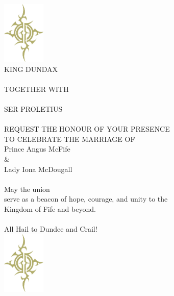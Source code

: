 {\centering%
	\vspace*{1cm}\hfill\\%
	\includegraphics[height=3cm,keepaspectratio]{../images/Gloryhammer_Coat_of_Arms-gold}\\
	{\darkcrystalfont\color{white}%
		{\LARGE KING DUNDAX \\\hfill\\}%
		{\large TOGETHER WITH\\\hfill\\}%
		{\LARGE SER PROLETIUS\\\hfill\\}%
		{\large REQUEST THE HONOUR OF YOUR PRESENCE\\TO CELEBRATE THE MARRIAGE OF}%
	}%
	\vspace*{0.6cm}\hfill\\%
	{\fontsize{40}{40}\selectfont\newspaperFancyHeaderFont\color{titlegold} Prince Angus McFife\\\&\\Lady Iona McDougall\\}%
	\vspace*{0.8cm}\hfill\\%
	{\large\darkcrystalfont\color{white}May the union\\serve as a beacon of hope, courage, and unity to the\\Kingdom of Fife and beyond.}\\%
	\vspace*{0.75cm}\hfill\\%
	{\Large\darkcrystalfont\color{white}All Hail to Dundee and Crail!}\\%
	\includegraphics[height=3cm,keepaspectratio]{../images/Gloryhammer_Coat_of_Arms-gold}\\%
}%


